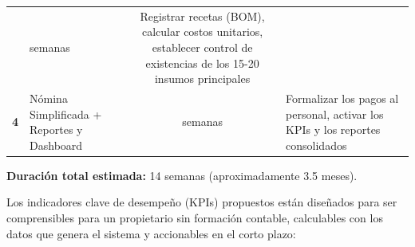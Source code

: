 \documentclass[
  12pt,
  spanish,
]{article}
\begin{document}
\begin{longtable}[]{@{}clcl@{}}
\begin{minipage}[t]{0.17\columnwidth}
\end{minipage} & \begin{minipage}[t]{0.28\columnwidth}\centering
4 semanas\strut
\end{minipage} & \begin{minipage}[t]{0.17\columnwidth}\raggedright
Registrar recetas (BOM), calcular costos unitarios, establecer control
de existencias de los 15-20 insumos principales\strut
\end{minipage}\tabularnewline
\begin{minipage}[t]{0.28\columnwidth}\centering
\textbf{4}\strut
\end{minipage} & \begin{minipage}[t]{0.17\columnwidth}\raggedright
Nómina Simplificada + Reportes y Dashboard\strut
\end{minipage} & \begin{minipage}[t]{0.28\columnwidth}\centering
3 semanas\strut
\end{minipage} & \begin{minipage}[t]{0.17\columnwidth}\raggedright
Formalizar los pagos al personal, activar los KPIs y los reportes
consolidados\strut
\end{minipage}\tabularnewline
\bottomrule
\end{longtable}

\textbf{Duración total estimada:} 14 semanas (aproximadamente 3.5
meses).

Los indicadores clave de desempeño (KPIs) propuestos están diseñados
para ser comprensibles para un propietario sin formación contable,
calculables con los datos que genera el sistema y accionables en el
corto plazo:
\end{document}
